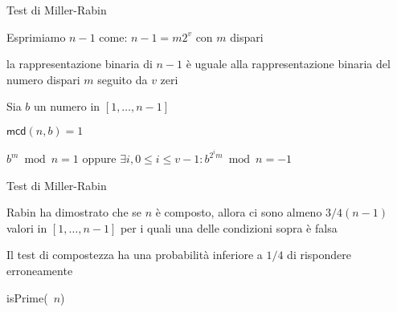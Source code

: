 \begin{frame}{Test di Miller-Rabin}

\vspace{-9pt}
\BIL
\item Esprimiamo $n-1$ come: $n-1 = m 2^v$ con $m$ dispari
  \BI
  \item la rappresentazione binaria di $n-1$ è uguale alla rappresentazione 
    binaria del numero dispari $m$ seguito da $v$ zeri
  \EI
\item Sia $b$ un numero in $[1, \ldots, n-1]$
\EIL

\begin{overprint}
\end{overprint}
\BEL
\item $\textsf{mcd}(n,b) = 1$
\item $b^m \bmod n = 1$ oppure $\exists i, 0 \leq i \leq v-1: b^{2^im} \bmod n = -1$
\EEL
      
\end{frame}

\begin{frame}{Test di Miller-Rabin}

\vspace{-9pt}
\BIL
\item Rabin ha dimostrato che se $n$ è composto, allora ci sono
almeno $3/4(n-1)$ valori in $[1, \ldots, n-1]$ per i quali una delle condizioni sopra è falsa
\item Il test di compostezza ha una probabilità inferiore a $1/4$ di rispondere
erroneamente
\EIL

\begin{Procedure}
\caption[A]{\textsf{isPrime}(\INTEGER\ $n$)}
\Return \TRUE\;
\end{Procedure}

\end{frame}

